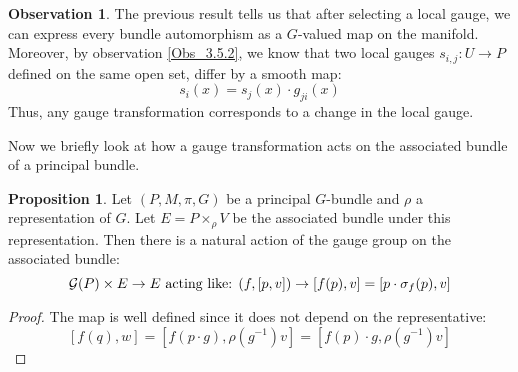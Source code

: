 \documentclass[12pt,a4paper]{report}
\theoremstyle{definition}
\theoremstyle{Theorem}
\newtheorem{Prop}[Def]{Proposition}
\theoremstyle{definition}
\theoremstyle{definition}
\newtheorem{Obs}[Def]{Observation}
\begin{document}
	\begin{Obs}
		The previous result tells us that after selecting a local gauge, we can express every bundle automorphism as a $G$-valued map on the manifold. Moreover, by observation \ref{Obs_3.5.2}, we know that two local gauges $s_{i,j}:U\rightarrow P$ defined on the same open set, differ by a smooth map: $$s_i(x)=s_j(x)\cdot g_{ji}(x)$$
		Thus, any gauge transformation corresponds to a change in the local gauge.
	\end{Obs}
	Now we briefly look at how a gauge transformation acts on the associated bundle of a principal bundle.
	\begin{Prop}\label{Prop_7.1.3}
		Let $(P,M,\pi,G)$ be a principal $G$-bundle and $\rho$ a representation of $G$. Let $E=P\times_\rho V$ be the associated bundle under this representation. Then there is a natural action of the gauge group on the associated bundle:
		$$\mathcal{G}(P)\times E\rightarrow E\hbox{ acting like: }(f,[p,v])\rightarrow [f(p),v]=[p\cdot \sigma_f(p),v]$$
	\end{Prop}
	\begin{proof}
		The map is well defined since it does not depend on the representative:
		$$[f(q),w]=[f(p\cdot g),\rho(g^{-1})v]=[f(p)\cdot g,\rho(g^{-1})v]$$
	\end{proof}
\end{document}
